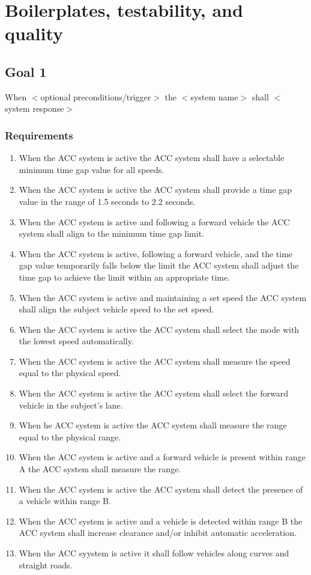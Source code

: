 
\section{Boilerplates, testability, and quality}


\subsection{Goal 1}
When $<$optional preconditions/trigger$>$ the $<$system name$>$ shall $<$system response$>$

\subsubsection{Requirements} \label{goal_1_requirements}
\begin{enumerate}
    \item When the ACC system is active the ACC system shall have a selectable minimum time gap value for all speeds.
    \item When the ACC system is active the ACC system shall provide a time gap value in the range of 1.5 seconds to 2.2 seconds.
    \item When the ACC system is active and following a forward vehicle the ACC system shall align to the minimum time gap limit.
    \item When the ACC system is active, following a forward vehicle, and the time gap value temporarily falls below the limit the ACC system shall adjust the time gap to achieve the limit within an appropriate time.
    \item When the ACC system is active and maintaining a set speed the ACC system shall align the subject vehicle speed to the set speed.
    \item When the ACC system is active the ACC system shall select the mode with the lowest speed automatically.
    \item When the ACC system is active the ACC system shall measure the speed equal to the physical speed. 
    \item When the ACC system is active the ACC system shall select the forward vehicle in the subject’s lane.
    \item When he ACC system is active the ACC system shall measure the range equal to the physical range.
    \item When the ACC system is active and a forward vehicle is present within range A the ACC system shall measure the range.
    \item When the ACC system is active the ACC system shall detect the presence of a vehicle within range B.
    \item When the ACC system is active and a vehicle is detected within range B the ACC system shall increase clearance and/or inhibit automatic acceleration.
    \item When the ACC syystem is active it shall follow vehicles along curves and straight roads.
\end{enumerate}

